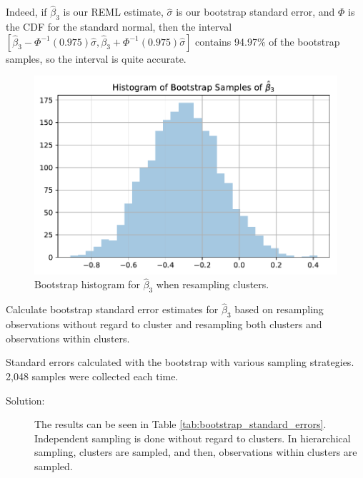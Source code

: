 \documentclass[11pt, letterpaper]{article}
\begin{document}
\begin{enumerate}[(a)]
\begin{description}
  Indeed, if $\hat{\beta}_3$ is our REML estimate, $\hat{\sigma}$ is our
  bootstrap standard error, and $\Phi$ is the CDF for the standard normal, then
  the interval
  $\left[\hat{\beta}_3 - \Phi^{-1}\left(0.975\right)\hat{\sigma}, \hat{\beta}_3
    + \Phi^{-1}\left(0.975\right)\hat{\sigma}\right]$ contains 94.97\% of the
  bootstrap samples, so the interval is quite accurate.
\end{description}

\begin{figure}
  \centering
  \includegraphics{hist_bootstrap_cluster.pdf}
  \caption{Bootstrap histogram for $\hat\beta_3$ when resampling clusters.}
  \label{fig:hist_bootstrap_cluster}
\end{figure}

{\em \item Calculate bootstrap standard error estimates for $\hat{\beta}_3$ based on resampling observations  
  without regard to cluster and resampling both clusters and observations within clusters. }

\begin{table}
  \centering
  
  \caption{Standard errors calculated with the bootstrap with various sampling
    strategies. 2,048 samples were collected each time.}
  \label{tab:bootstrap_standard_errors}
\end{table}

\begin{description}
\item[Solution:] The results can be seen in Table
  \ref{tab:bootstrap_standard_errors}. Independent sampling is done without
  regard to clusters. In hierarchical sampling, clusters are sampled, and then,
  observations within clusters are sampled.


\end{description}
\end{enumerate}
\end{document}
